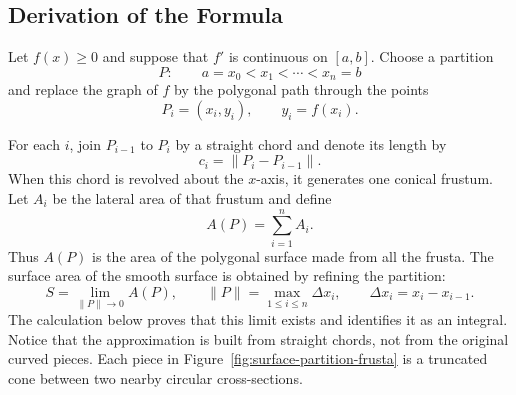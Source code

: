 \subsection{Derivation of the Formula}

Let \(f(x)\geq0\) and suppose that \(f'\) is continuous on \([a,b]\).
Choose a partition
\[
    P:\qquad a=x_0<x_1<\cdots<x_n=b
\]
and replace the graph of \(f\) by the polygonal path through the points
\[
    P_i=(x_i,y_i),
    \qquad y_i=f(x_i).
\]

For each \(i\), join \(P_{i-1}\) to \(P_i\) by a straight chord and denote
its length by
\[
    c_i=\lVert P_i-P_{i-1}\rVert.
\]
When this chord is revolved about the \(x\)-axis, it generates one conical
frustum.  Let \(A_i\) be the lateral area of that frustum and define
\[
    A(P)=\sum_{i=1}^n A_i.
\]
Thus \(A(P)\) is the area of the polygonal surface made from all the
frusta.  The surface area of the smooth surface is obtained by refining the
partition:
\[
    S=\lim_{\lVert P\rVert\to0}A(P),
    \qquad
    \lVert P\rVert
    =\max_{1\leq i\leq n}\Delta x_i,
    \qquad
    \Delta x_i=x_i-x_{i-1}.
\]
The calculation below proves that this limit exists and identifies it as an
integral.  Notice that the approximation is built from straight chords,
not from the original curved pieces.  Each piece in
Figure~\ref{fig:surface-partition-frusta} is a truncated cone between two
nearby circular cross-sections.

